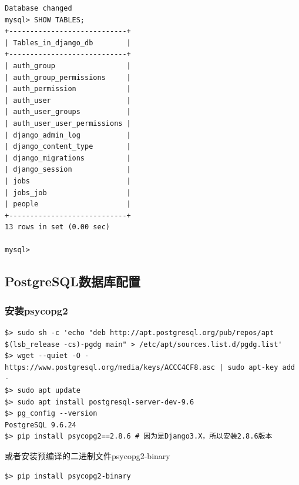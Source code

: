 \begin{example}
\begin{lstlisting}[style=demostyle,numbers=none]
Database changed
mysql> SHOW TABLES;
+----------------------------+
| Tables_in_django_db        |
+----------------------------+
| auth_group                 |
| auth_group_permissions     |
| auth_permission            |
| auth_user                  |
| auth_user_groups           |
| auth_user_user_permissions |
| django_admin_log           |
| django_content_type        |
| django_migrations          |
| django_session             |
| jobs                       |
| jobs_job                   |
| people                     |
+----------------------------+
13 rows in set (0.00 sec)

mysql>
\end{lstlisting}
\end{example}

\subsection{PostgreSQL数据库配置}
\subsubsection{安装psycopg2}
\begin{lstlisting}[style=demostyle,numbers=none]
$> sudo sh -c 'echo "deb http://apt.postgresql.org/pub/repos/apt $(lsb_release -cs)-pgdg main" > /etc/apt/sources.list.d/pgdg.list'
$> wget --quiet -O - https://www.postgresql.org/media/keys/ACCC4CF8.asc | sudo apt-key add -
$> sudo apt update
$> sudo apt install postgresql-server-dev-9.6
$> pg_config --version
PostgreSQL 9.6.24
$> pip install psycopg2==2.8.6 # 因为是Django3.X，所以安装2.8.6版本
\end{lstlisting}

或者安装预编译的二进制文件psycopg2-binary
\begin{lstlisting}[style=demostyle,numbers=none]
$> pip install psycopg2-binary
\end{lstlisting}

